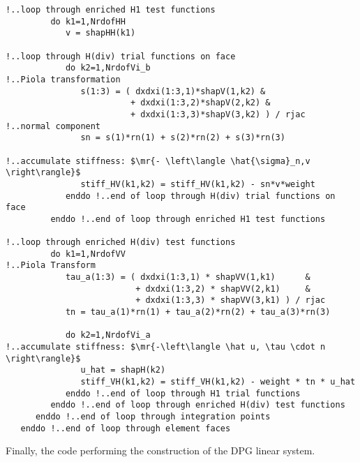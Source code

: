 \begin{lstlisting}[mathescape,caption=\file{POISSON/ULTRAWEAK\_DPG/}\routine{elem}: boundary integration]
!..loop through enriched H1 test functions
         do k1=1,NrdofHH
            v = shapHH(k1)

!..loop through H(div) trial functions on face
            do k2=1,NrdofVi_b
!..Piola transformation
               s(1:3) = ( dxdxi(1:3,1)*shapV(1,k2) &
                         + dxdxi(1:3,2)*shapV(2,k2) &
                         + dxdxi(1:3,3)*shapV(3,k2) ) / rjac
!..normal component
               sn = s(1)*rn(1) + s(2)*rn(2) + s(3)*rn(3)

!..accumulate stiffness: $\mr{- \left\langle \hat{\sigma}_n,v \right\rangle}$
               stiff_HV(k1,k2) = stiff_HV(k1,k2) - sn*v*weight
            enddo !..end of loop through H(div) trial functions on face
         enddo !..end of loop through enriched H1 test functions

!..loop through enriched H(div) test functions
         do k1=1,NrdofVV
!..Piola Transform
            tau_a(1:3) = ( dxdxi(1:3,1) * shapVV(1,k1)      &
                          + dxdxi(1:3,2) * shapVV(2,k1)     &
                          + dxdxi(1:3,3) * shapVV(3,k1) ) / rjac
            tn = tau_a(1)*rn(1) + tau_a(2)*rn(2) + tau_a(3)*rn(3)

            do k2=1,NrdofVi_a
!..accumulate stiffness: $\mr{-\left\langle \hat u, \tau \cdot n \right\rangle}$
               u_hat = shapH(k2)
               stiff_VH(k1,k2) = stiff_VH(k1,k2) - weight * tn * u_hat
            enddo !..end of loop through H1 trial functions
         enddo !..end of loop through enriched H(div) test functions
      enddo !..end of loop through integration points
   enddo !..end of loop through element faces

\end{lstlisting}
Finally, the code performing the construction of the DPG linear system.
